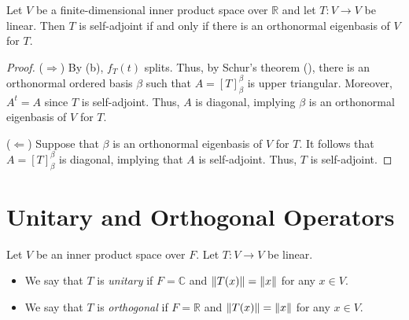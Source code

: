 \begin{theorem}
  \label{thm:orthonormal-eigenbasis-real}
  Let $V$ be a finite-dimensional inner product space over $\mathbb{R}$ and let
  $T: V \to V$ be linear.
  Then $T$ is self-adjoint if and only if there is an orthonormal eigenbasis of
  $V$ for $T$.
\end{theorem}
\begin{proof}
  ($\Rightarrow$)
  By  (b), $f_T(t)$ splits.
  Thus, by Schur's theorem (), there is an orthonormal ordered
  basis $\beta$ such that $A = [T]_\beta^\beta$ is upper triangular.
  Moreover, $A^t = A$ since $T$ is self-adjoint.
  Thus, $A$ is diagonal, implying $\beta$ is an orthonormal eigenbasis of $V$
  for $T$.

  ($\Leftarrow$)
  Suppose that $\beta$ is an orthonormal eigenbasis of $V$ for $T$.
  It follows that $A = [T]_\beta^\beta$ is diagonal, implying that $A$ is
  self-adjoint.
  Thus, $T$ is self-adjoint.
\end{proof}

\section{Unitary and Orthogonal Operators}
\begin{definition}
  Let $V$ be an inner product space over $F$.
  Let $T: V \to V$ be linear.
  \begin{itemize}
    \item We say that $T$ is \emph{unitary} if $F = \mathbb{C}$ and
    $\left\Vert T(x) \right\Vert = \left\Vert x \right\Vert$ for any $x \in V$.
    \item We say that $T$ is \emph{orthogonal} if $F = \mathbb{R}$ and
    $\left\Vert T(x) \right\Vert = \left\Vert x \right\Vert$ for any $x \in V$.
  \end{itemize}
\end{definition}

